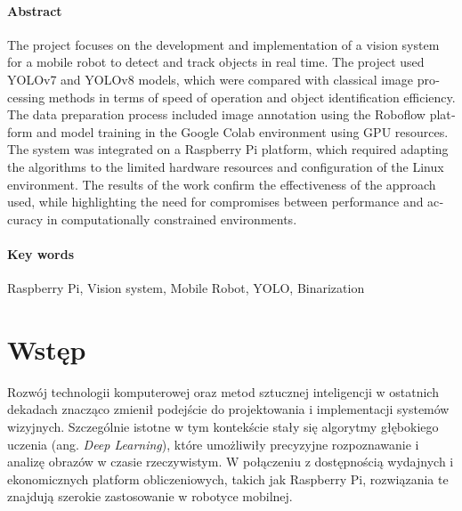 \documentclass[a4paper,twoside,12pt]{book}
\newcounter{stronyPozaNumeracja}
\begin{document}
\subsubsection*{Abstract} 
\begin{otherlanguage}{british}
    The project focuses on the development and implementation of a vision system for a mobile robot to detect and track objects in real time. The project used YOLOv7 and YOLOv8 models, which were compared with classical image processing methods in terms of speed of operation and object identification efficiency. The data preparation process included image annotation using the Roboflow platform and model training in the Google Colab environment using GPU resources.
    The system was integrated on a Raspberry Pi platform, which required adapting the algorithms to the limited hardware resources and configuration of the Linux environment.
    The results of the work confirm the effectiveness of the approach used, while highlighting the need for compromises between performance and accuracy in computationally constrained environments.
\end{otherlanguage}
\subsubsection*{Key words}  
\begin{otherlanguage}{british}
Raspberry Pi, Vision system, Mobile Robot, YOLO, Binarization
\end{otherlanguage}




\tableofcontents

\setcounter{stronyPozaNumeracja}{\value{page}}
\mainmatter
\pagestyle{empty}

\cleardoublepage

\pagestyle{NumeryStronNazwyRozdzialow}


\chapter{Wstęp}
\label{ch:wstep}

Rozwój technologii komputerowej oraz metod sztucznej inteligencji w ostatnich dekadach znacząco zmienił podejście do projektowania i implementacji systemów wizyjnych. Szczególnie istotne w tym kontekście stały się algorytmy głębokiego uczenia (ang. \textit{Deep Learning}), które umożliwiły precyzyjne rozpoznawanie i analizę obrazów w czasie rzeczywistym. W połączeniu z dostępnością wydajnych i ekonomicznych platform obliczeniowych, takich jak Raspberry Pi, rozwiązania te znajdują szerokie zastosowanie w robotyce mobilnej. 
\end{document}
